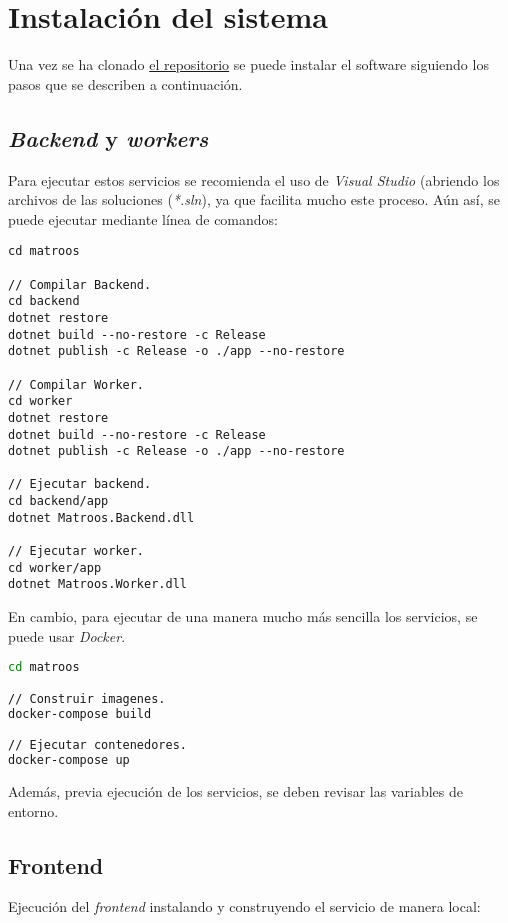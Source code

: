 \chapter{Instalación del sistema}

Una vez se ha clonado \href{https://github.com/harvestcore/matroos}{el repositorio} se puede instalar el software siguiendo los pasos que se describen a continuación.

\section{\textit{Backend} y \textit{workers}}


Para ejecutar estos servicios se recomienda el uso de \textit{Visual Studio} (abriendo los archivos de las soluciones (\textit{*.sln}), ya que facilita mucho este proceso. Aún así, se puede ejecutar mediante línea de comandos:

\begin{lstlisting}
cd matroos

// Compilar Backend.
cd backend
dotnet restore
dotnet build --no-restore -c Release
dotnet publish -c Release -o ./app --no-restore

// Compilar Worker.
cd worker
dotnet restore
dotnet build --no-restore -c Release
dotnet publish -c Release -o ./app --no-restore

// Ejecutar backend.
cd backend/app
dotnet Matroos.Backend.dll

// Ejecutar worker.
cd worker/app
dotnet Matroos.Worker.dll
\end{lstlisting}

En cambio, para ejecutar de una manera mucho más sencilla los servicios, se puede usar \textit{Docker}.

\begin{lstlisting}[language=sh]
cd matroos

// Construir imagenes.
docker-compose build

// Ejecutar contenedores.
docker-compose up
\end{lstlisting}

Además, previa ejecución de los servicios, se deben revisar las variables de entorno.




\section{Frontend}

Ejecución del \textit{frontend} instalando y construyendo el servicio de manera local:

